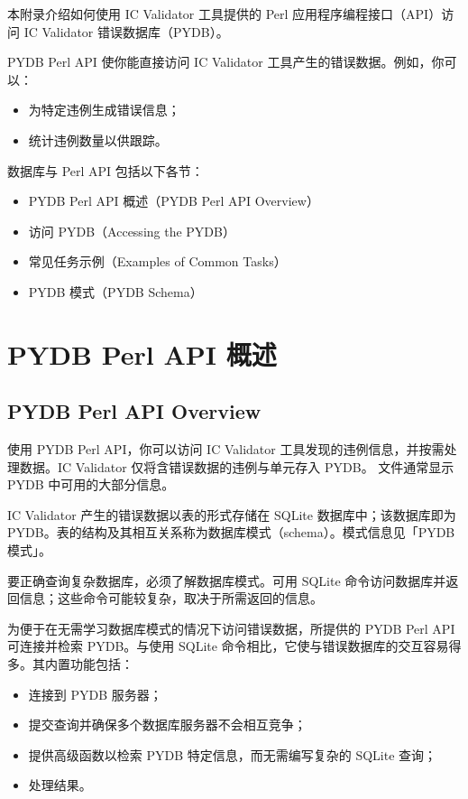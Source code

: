 \label{app:e}

本附录介绍如何使用 IC Validator 工具提供的 Perl 应用程序编程接口（API）访问 IC Validator 错误数据库（PYDB）。

PYDB Perl API 使你能直接访问 IC Validator 工具产生的错误数据。例如，你可以：
\begin{itemize}
  \item 为特定违例生成错误信息；
  \item 统计违例数量以供跟踪。
\end{itemize}

数据库与 Perl API 包括以下各节：
\begin{itemize}
  \item PYDB Perl API 概述（PYDB Perl API Overview）
  \item 访问 PYDB（Accessing the PYDB）
  \item 常见任务示例（Examples of Common Tasks）
  \item PYDB 模式（PYDB Schema）
\end{itemize}

\section{PYDB Perl API 概述}
\subsection*{PYDB Perl API Overview}

使用 PYDB Perl API，你可以访问 IC Validator 工具发现的违例信息，并按需处理数据。IC Validator 仅将含错误数据的违例与单元存入 PYDB。 文件通常显示 PYDB 中可用的大部分信息。

IC Validator 产生的错误数据以表的形式存储在 SQLite 数据库中；该数据库即为 PYDB。表的结构及其相互关系称为数据库模式（schema）。模式信息见「PYDB 模式」。

要正确查询复杂数据库，必须了解数据库模式。可用 SQLite 命令访问数据库并返回信息；这些命令可能较复杂，取决于所需返回的信息。

为便于在无需学习数据库模式的情况下访问错误数据，所提供的 PYDB Perl API 可连接并检索 PYDB。与使用 SQLite 命令相比，它使与错误数据库的交互容易得多。其内置功能包括：
\begin{itemize}
  \item 连接到 PYDB 服务器；
  \item 提交查询并确保多个数据库服务器不会相互竞争；
  \item 提供高级函数以检索 PYDB 特定信息，而无需编写复杂的 SQLite 查询；
  \item 处理结果。
\end{itemize}

